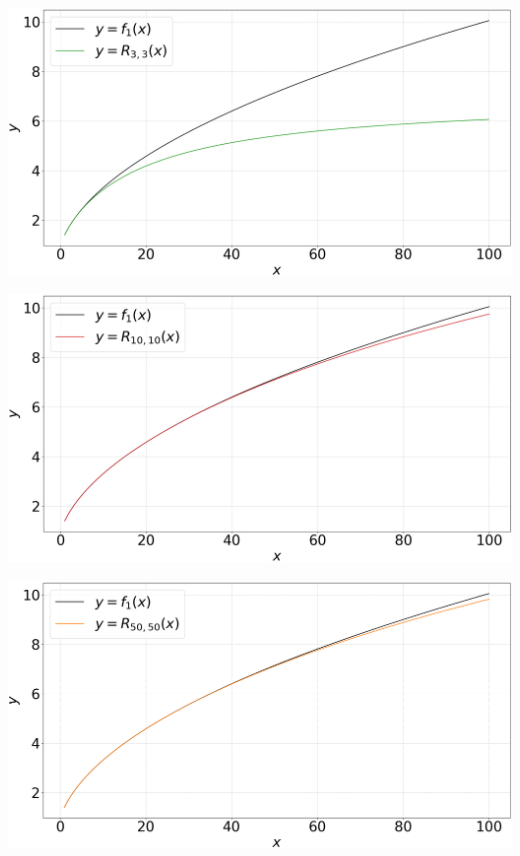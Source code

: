 \documentclass[12pt, a4paper]{article}
\begin{document}
\begin{minipage}{\textwidth}\centering
	\includegraphics[width=0.8\linewidth]{q3_L=3}
	\label{q3_L=3}
\end{minipage}
\vspace{0.1cm}

\begin{minipage}{\textwidth}\centering
	\includegraphics[width=0.8\linewidth]{q3_L=10}
	\label{q3_L=10}
\end{minipage}
\vspace{0.1cm}

\begin{minipage}{\textwidth}\centering
	\includegraphics[width=0.8\linewidth]{q3_L=50}
	\label{q3_L=50}
\end{minipage}
\vspace{0.1cm}
\end{document}
